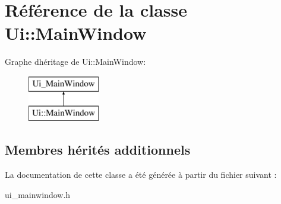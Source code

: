 \hypertarget{class_ui_1_1_main_window}{}\section{Référence de la classe Ui\+::Main\+Window}
\label{class_ui_1_1_main_window}
Graphe d\textquotesingle{}héritage de Ui\+::Main\+Window\+:\begin{figure}[H]
\begin{center}
\leavevmode
\includegraphics[height=2.000000cm]{class_ui_1_1_main_window}
\end{center}
\end{figure}
\subsection*{Membres hérités additionnels}


La documentation de cette classe a été générée à partir du fichier suivant \+:\begin{DoxyCompactItemize}
\item 
ui\+\_\+mainwindow.\+h\end{DoxyCompactItemize}
